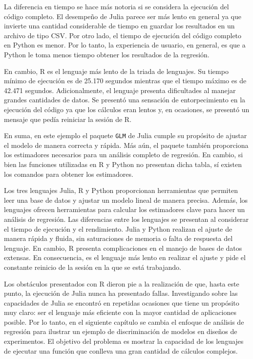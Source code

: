 La diferencia en tiempo se hace más notoria si se considera la ejecución del código completo. El desempeño de \textsf{Julia} parece ser más lento en general ya que invierte una cantidad considerable de tiempo en guardar los resultados en un archivo de tipo \textsf{CSV}. Por otro lado, el tiempo de ejecución del código completo en \textsf{Python} es menor. Por lo tanto, la experiencia de usuario, en general, es que a \textsf{Python} le toma menos tiempo obtener los resultados de la regresión. 

En cambio, \textsf{R} es el lenguaje más lento de la triada de lenguajes. Su tiempo mínimo de ejecución es de 25.170 segundos mientras que el tiempo máximo es de 42.471 segundos. Adicionalmente, el lenguaje presenta dificultades al manejar grandes cantidades de datos. Se presentó una sensación de entorpecimiento en la ejecución del código ya que los cálculos eran lentos y, en ocasiones, se presentó un mensaje que pedía reiniciar la sesión de \textsf{R}.    

En suma, en este ejemplo el paquete \texttt{GLM} de \textsf{Julia} cumple su propósito de ajustar el modelo de manera correcta y rápida. Más aún, el paquete también proporciona los estimadores necesarios para un análisis completo de regresión. En cambio, si bien las funciones utilizadas en \textsf{R} y \textsf{Python} no presentan dicha tabla, sí existen los comandos para obtener los estimadores. 

Los tres lenguajes \textsf{Julia, R} y \textsf{Python} proporcionan herramientas que permiten leer una base de datos y ajustar un modelo lineal de manera precisa. Además, los lenguajes ofrecen herramientas para calcular los estimadores clave para hacer un análisis de regresión. Las diferencias entre los lenguajes se presentan al considerar el tiempo de ejecución y el rendimiento. \textsf{Julia} y \textsf{Python} realizan el ajuste de manera rápida y fluida, sin saturaciones de memoria o falta de respuesta del lenguaje. En cambio, \textsf{R} presenta complicaciones en el manejo de bases de datos extensas. En consecuencia, es el lenguaje más lento en realizar el ajuste y pide el constante reinicio de la sesión en la que se está trabajando. 

Los obstáculos presentados con \textsf{R} dieron pie a la realización de que, hasta este punto, la ejecución de \textsf{Julia} nunca ha presentado fallas. Investigando sobre las capacidades de \textsf{Julia} se encontró en repetidas ocasiones que tiene un propósito muy claro: ser  el lenguaje más eficiente con la mayor cantidad de aplicaciones posible. Por lo tanto, en el siguiente capítulo se cambia el enfoque de análisis de regresión para ilustrar un ejemplo de discriminación de modelos en diseños de experimentos. El objetivo del problema es mostrar la capacidad de los lenguajes de ejecutar una función que conlleva una gran cantidad de cálculos complejos. 


